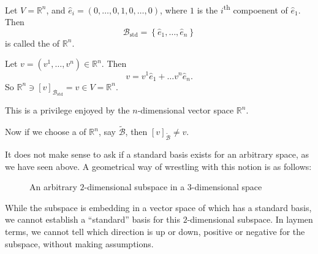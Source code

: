 \documentclass[notoc,notitlepage]{tufte-book}
\DeclareMathOperator{\std}{std}
\begin{document}
\begin{eg}
  Let $V = \mathbb{R}^n$, and $\hat{e}_i = ( 0, \ldots, 0, 1, 0, \ldots, 0 )$, where $1$ is the $i$\textsuperscript{th} compoenent of $\hat{e}_1$. Then
  \begin{equation*}
    \mathcal{B}_{\std} = \left\{ \hat{e}_1, \ldots, \hat{e}_n \right\}
  \end{equation*}
  is called the  of $\mathbb{R}^n$.
\end{eg}

\begin{note}
  Let $v = (v^1, \ldots, v^n) \in \mathbb{R}^n$. Then
  \begin{equation*}
    v = v^1 \hat{e}_1 + \hdots v^n \hat{e}_n.
  \end{equation*}
  So $\mathbb{R}^n \ni [v]_{\mathcal{B}_{\std}} = v \in V = \mathbb{R}^n$.

  This is a privilege enjoyed by the $n$-dimensional vector space $\mathbb{R}^n$.
\end{note}

Now if we choose a  of $\mathbb{R}^n$, say $\tilde{\mathcal{B}}$, then $[v]_{\tilde{\mathcal{B}}} \neq v$.

\begin{note}
  It does not make sense to ask if a standard basis exists for an arbitrary space, as we have seen above. A geometrical way of wrestling with this notion is as follows:

  \begin{figure}[ht]
    \centering
    \caption{An arbitrary $2$-dimensional subspace in a $3$-dimensional space}
    \label{fig:an_arbitrary_2-dimensional_subspace_in_a_3-dimensional_space}
  \end{figure}

  While the subspace is embedding in a vector space of which has a standard basis, we cannot establish a ``standard'' basis for this $2$-dimensional subspace. In laymen terms, we cannot tell which direction is up or down, positive or negative for the subspace, without making assumptions.
\end{note}
\end{document}
